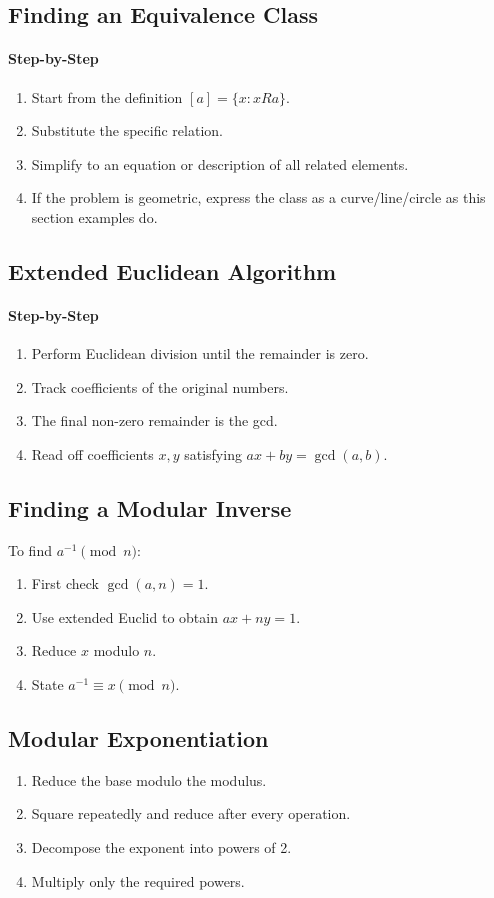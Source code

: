 \documentclass[12pt]{article}
\newcommand{\Step}{\paragraph{Step-by-Step}}
\begin{document}
\subsection{Finding an Equivalence Class}
\Step
\begin{enumerate}
    \item Start from the definition $[a]=\{x:xRa\}$.
    \item Substitute the specific relation.
    \item Simplify to an equation or description of all related elements.
    \item If the problem is geometric, express the class as a curve/line/circle as this section examples do.
\end{enumerate}

\subsection{Extended Euclidean Algorithm}
\Step
\begin{enumerate}
    \item Perform Euclidean division until the remainder is zero.
    \item Track coefficients of the original numbers.
    \item The final non-zero remainder is the gcd.
    \item Read off coefficients $x,y$ satisfying $ax+by=\gcd(a,b)$.
\end{enumerate}

\subsection{Finding a Modular Inverse}
To find $a^{-1}\pmod n$:
\begin{enumerate}
    \item First check $\gcd(a,n)=1$.
    \item Use extended Euclid to obtain $ax+ny=1$.
    \item Reduce $x$ modulo $n$.
    \item State $a^{-1}\equiv x\pmod n$.
\end{enumerate}

\subsection{Modular Exponentiation}
\begin{enumerate}
    \item Reduce the base modulo the modulus.
    \item Square repeatedly and reduce after every operation.
    \item Decompose the exponent into powers of 2.
    \item Multiply only the required powers.
\end{enumerate}
\end{document}
